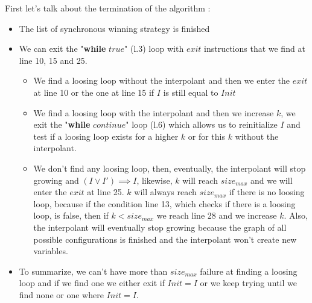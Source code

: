 \documentclass{article}
\begin{document}
\noindent First let's talk about the termination of the algorithm :
\begin{itemize}
    \item The list of synchronous winning strategy is finished
    \item We can exit the "\textbf{while} $true$" (l.3) loop with $exit$ instructions that we find at line 10, 15 and 25.
    \begin{itemize}
        \item We find a loosing loop without the interpolant and then we enter the $exit$ at line 10 or the one at line 15 if $I$ is still equal to $Init$
        \item We find a loosing loop with the interpolant and then we increase $k$, we exit the "\textbf{while} $continue$" loop (l.6) which allows us to reinitialize $I$ and test if a loosing loop exists for a higher $k$ or for this $k$ without the interpolant.
        \item We don't find any loosing loop, then, eventually, the interpolant will stop growing and $(I \lor I') \implies I$, likewise, $k$ will reach $size_{max}$ and we will enter the $exit$ at line 25. $k$ will always reach $size_{max}$ if there is no loosing loop, because if the condition line 13, which checks if there is a loosing loop, is false, then if $k < size_{max}$ we reach line 28 and we increase $k$. Also, the interpolant will eventually stop growing because the graph of all possible configurations is finished and the interpolant won't create new variables.
    \end{itemize}
    \item To summarize, we can't have more than $size_{max}$ failure at finding a loosing loop and if we find one we either exit if $Init = I$ or we keep trying until we find none or one where $Init = I$.
\end{itemize}
\end{document}
